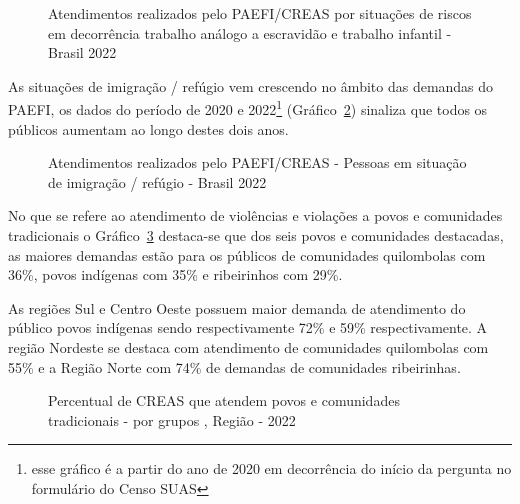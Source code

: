 \documentclass[
  letterpaper,
  DIV=11,
  numbers=noendperiod]{scrreprt}
\begin{document}
\begin{figure}


\caption{\label{fig-paefi2_creas}Atendimentos realizados pelo
PAEFI/CREAS por situações de riscos em decorrência trabalho análogo a
escravidão e trabalho infantil - Brasil 2022}

\end{figure}%

As situações de imigração / refúgio vem crescendo no âmbito das demandas
do PAEFI, os dados do período de 2020 e 2022\footnote{esse gráfico é a
  partir do ano de 2020 em decorrência do início da pergunta no
  formulário do Censo SUAS} (Gráfico~\ref{fig-paefi6_creas}) sinaliza
que todos os públicos aumentam ao longo destes dois anos.

\begin{figure}


\caption{\label{fig-paefi6_creas}Atendimentos realizados pelo
PAEFI/CREAS - Pessoas em situação de imigração / refúgio - Brasil 2022}

\end{figure}%

No que se refere ao atendimento de violências e violações a povos e
comunidades tradicionais o Gráfico~\ref{fig-creas-tradicionais}
destaca-se que dos seis povos e comunidades destacadas, as maiores
demandas estão para os públicos de comunidades quilombolas com 36\%,
povos indígenas com 35\% e ribeirinhos com 29\%.

As regiões Sul e Centro Oeste possuem maior demanda de atendimento do
público povos indígenas sendo respectivamente 72\% e 59\%
respectivamente. A região Nordeste se destaca com atendimento de
comunidades quilombolas com 55\% e a Região Norte com 74\% de demandas
de comunidades ribeirinhas.

\begin{figure}


\caption{\label{fig-creas-tradicionais}Percentual de CREAS que atendem
povos e comunidades tradicionais - por grupos , Região - 2022}

\end{figure}%
\end{document}
